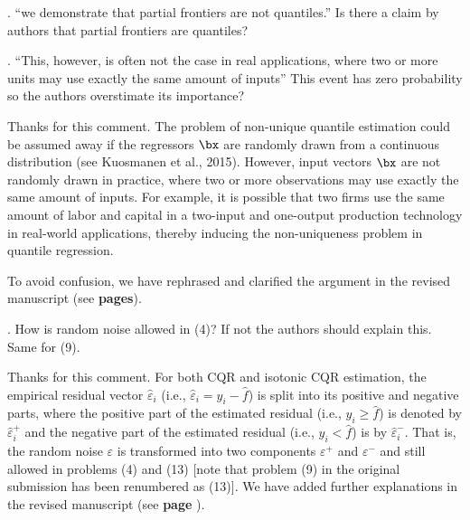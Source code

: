 \documentclass[12pt]{article}
\newcommand{\np}{\vskip 0.3cm}
\begin{document}

 \np
 \np
 \np
\begin{sf}
{. ``we demonstrate that partial frontiers are not quantiles.'' Is there a claim by authors that partial frontiers are quantiles?}
\end{sf}
\begin{response}
\end{response}

 
 \np
 \np
 \np
\begin{sf}
{. ``This, however, is often not the case in real applications, where two or more units may use exactly the same amount of inputs'' This event has zero probability so the authors overstimate its importance?}
\end{sf}
\begin{response}
Thanks for this comment. The problem of non-unique quantile estimation could be assumed away if the regressors $\bx$ are randomly drawn from a continuous distribution (see Kuosmanen et al., 2015). However, input vectors $\bx$ are not randomly drawn in practice, where two or more observations may use exactly the same amount of inputs. For example, it is possible that two firms use the same amount of labor and capital in a two-input and one-output production technology in real-world applications, thereby inducing the non-uniqueness problem in quantile regression.\np

To avoid confusion, we have rephrased and clarified the argument in the revised manuscript (see \textbf{pages}).
\end{response}

 
 \np
 \np
 \np
\begin{sf}
{. How is random noise allowed in (4)? If not the authors should explain this. Same for (9).}
\end{sf}
\begin{response}
Thanks for this comment. For both CQR and isotonic CQR estimation, the empirical residual vector $\hat{\varepsilon}_i$ (i.e., $\hat{\varepsilon}_i = y_i - \hat{f}$) is split into its positive and negative parts, where the positive part of the estimated residual (i.e., $y_i \ge \hat{f}$) is denoted by $\hat{\varepsilon}_i^{+}$ and the negative part of the estimated residual (i.e., $y_i < \hat{f}$) is by $\hat{\varepsilon}_i^{-}$. That is, the random noise $\varepsilon$ is transformed into two components $\varepsilon^{+}$ and $\varepsilon^{-}$ and still allowed in problems (4) and (13) [note that problem (9) in the original submission has been renumbered as (13)]. We have added further explanations in the revised manuscript (see \textbf{page }).
\end{response}
\end{document}
